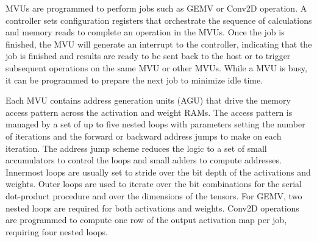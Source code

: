 \documentclass[sigconf]{acmart}
\newcommand{\MVU}{MVU}
\begin{document}
\MVU{}s are programmed to perform jobs such as GEMV or Conv2D operation. A controller sets configuration registers that orchestrate the sequence of calculations and memory reads to complete an operation in the \MVU{}s. %
Once the job is finished, the \MVU{} will generate an interrupt to the controller, indicating that the job is finished and results are ready to be sent back to the host or to trigger subsequent operations on the same \MVU{} or other \MVU{}s. While a \MVU{} is busy, it can be programmed to prepare the next job to minimize idle time. 


Each \MVU{} contains address generation units (AGU) that drive the memory access pattern across the activation and weight RAMs. 
The access pattern is managed by a set of up to five nested loops with parameters setting the number of iterations and the forward or backward address jumps to make on each iteration. The address jump scheme reduces the logic to a set of small accumulators to control the loops and small adders to compute addresses. Innermost loops are usually set to stride over the bit depth of the activations and weights. Outer loops are used to iterate over the bit combinations for the serial dot-product procedure and over the dimensions of the tensors. 
For GEMV, two nested loops are required for both activations and weights. Conv2D operations are programmed to compute one row of the output activation map per job, requiring four nested loops.
\end{document}
